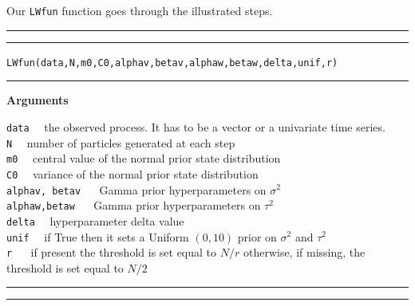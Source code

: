 \documentclass[
]{book}
\theoremstyle{break}
\theoremstyle{nonumberplain}
\begin{document}
Our \texttt{LWfun} function goes through the illustrated steps.\\

\hrule
\hrule

\hfill\break
\texttt{LWfun(data,N,m0,C0,alphav,betav,alphaw,betaw,delta,unif,r)}\\

\hrule

\textbf{Arguments}

\texttt{data} ~~the observed process. It has to be a vector or a
univariate time series.\\
\texttt{N} ~~number of particles generated at each step\\
\texttt{m0} ~~central value of the normal prior state distribution\\
\texttt{C0} ~~variance of the normal prior state distribution\\
\texttt{alphav, betav} ~~ Gamma prior hyperparameters on
\(\sigma^{2}\)\\
\texttt{alphaw,betaw} ~~ Gamma prior hyperparameters on \(\tau^{2}\)\\
\texttt{delta} ~~hyperparameter delta value\\
\texttt{unif} ~~if True then it sets a Uniform \((0,10)\) prior on
\(\sigma^{2}\) and \(\tau^{2}\)\\
\texttt{r} ~~ if present the threshold is set equal to \(N/r\)
otherwise, if missing, the threshold is set equal to \(N/2\)

\hrule
\hrule
\end{document}

